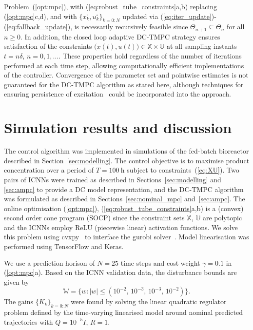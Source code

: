 \documentclass[final,5p,times,twocolumn,authoryear]{elsarticle}
\def\X{\mathbb{X}}
\def\U{\mathbb{U}}
\def\W{\mathbb{W}}
\begin{document}
Problem~(\ref{opt:mpc}), with (\ref{eq:robust_tube_constraints}a,b) replacing (\ref{opt:mpc}c,d), and with $\{x^\circ_k,u^\circ_k\}_{k=0:N}$ updated via  (\ref{eq:iter_update})-(\ref{eq:fallback_update}), is necessarily recursively feasible since $\Theta_{n+1}\subseteq\Theta_{n}$ for all $n\geq 0$. In addition, the closed loop adaptive DC-TMPC strategy ensures satisfaction of the constraints $\bigl(x(t),u(t)\bigr)\in\X\times\U$ at all sampling instants $t=n\delta$, $n=0,1,\ldots$. These properties hold regardless of the number of iterations performed at each time step, allowing computationally efficient implementations of the controller. Convergence of the parameter set  and pointwise estimates is not guaranteed for the DC-TMPC algorithm as stated here, although techniques for ensuring persistence of excitation~\citep[e.g.][]{lu23:auto}
could be incorporated into the approach.


\section{Simulation results and discussion}

The control algorithm was implemented in simulations of the fed-batch bioreactor described in Section~\ref{sec:modelling}.
%
The control objective is to maximise product concentration over a period of $T=\SI{100}{\hour}$ subject to constraints~(\ref{eq:XU}).
%
Two pairs of ICNNs were trained as described in Sections~\ref{sec:modelling} and \ref{sec:ampc} to provide a DC model representation, and the DC-TMPC algorithm was formulated as described in Sections~\ref{sec:nominal_mpc} and~\ref{sec:ampc}.
%
%
The online optimisation (\ref{opt:mpc}), (\ref{eq:robust_tube_constraints}a,b) is a (convex) second order cone program (SOCP) since the constraint sets $\X$, $\U$ are polytopic and the ICNNs employ ReLU (piecewise linear) activation functions. We solve this problem using cvxpy~\citep{cvxpy} to interface the gurobi solver~\citep{Gurobi}. Model linearisation was performed using TensorFlow and Keras. 

We use a prediction horison of $N=25$ time steps and cost weight $\gamma = 0.1$ in (\ref{opt:mpc}a). Based on the ICNN validation data, the disturbance bounds are given by
\[
  \W=\bigl\{w : \lvert w \rvert \leq (10^{-2}, \, 10^{-3}, \, 10^{-3}, \, 10^{-2}) \bigr\}.
\]
The gains $\{K_k\}_{k=0:N}$ were found by solving the linear quadratic regulator problem defined by the time-varying linearised model around nominal predicted trajectories with $Q = 10^{-5} I$, $R = 1$.
\end{document}
